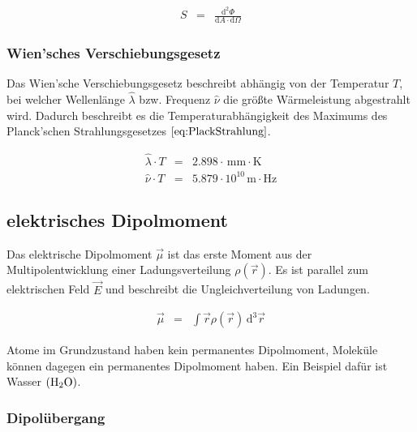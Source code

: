 \documentclass[12pt,a4paper]{scrartcl}
\numberwithin{equation}{section} %
\begin{document}
	\begin{eqnarray}
		S &=& \frac{\mathrm d^2\Phi}{\mathrm dA \cdot \mathrm d\Omega}
	\end{eqnarray}
	
	\hypertarget{wiensches-verschiebungsgesetz}{%
		\subsubsection{Wien'sches Verschiebungsgesetz}\label{wiensches-verschiebungsgesetz}}
	
	Das Wien'sche Verschiebungsgesetz beschreibt abhängig von der Temperatur $T$, bei welcher Wellenlänge $\hat{\lambda}$ bzw. Frequenz $\hat{\nu}$ die größte Wärmeleistung abgestrahlt wird. Dadurch beschreibt es die Temperaturabhängigkeit des Maximums des Planck'schen Strahlungsgesetzes $\eqref{eq:PlackStrahlung}$.
	
	\begin{eqnarray}
		\hat{\lambda}\cdot T &=& 2.898 \cdot \mathrm{\,mm\cdot K}
		\label{eq:WienLambda}\\
		\hat{\nu}\cdot T &=& 5.879\cdot10^{10} \mathrm{\,m\cdot Hz}
		\label{eq:WienNu}
	\end{eqnarray}
	
	\hypertarget{elektrisches-dipolmoment}{%
		\subsection{elektrisches Dipolmoment}\label{elektrisches-dipolmoment}}
	
	Das elektrische Dipolmoment $\vec \mu$ ist das erste Moment aus der Multipolentwicklung einer Ladungsverteilung $\rho(\vec r)$. \cite{Dipolmoment} Es ist parallel zum elektrischen Feld $\vec E$ und beschreibt die Ungleichverteilung von Ladungen.
	
	\begin{eqnarray}
		\vec \mu &=& \int \vec r \rho(\vec r) \,\mathrm d^3\vec r
	\end{eqnarray}
	
	\noindent
	Atome im Grundzustand haben kein permanentes Dipolmoment, Moleküle können dagegen ein permanentes Dipolmoment haben. Ein Beispiel dafür ist Wasser $(\ce{H_2O})$.
	
	\hypertarget{dipoluxfcbergang}{%
		\subsubsection{Dipolübergang}\label{dipoluxfcbergang}}
	
\end{document}
